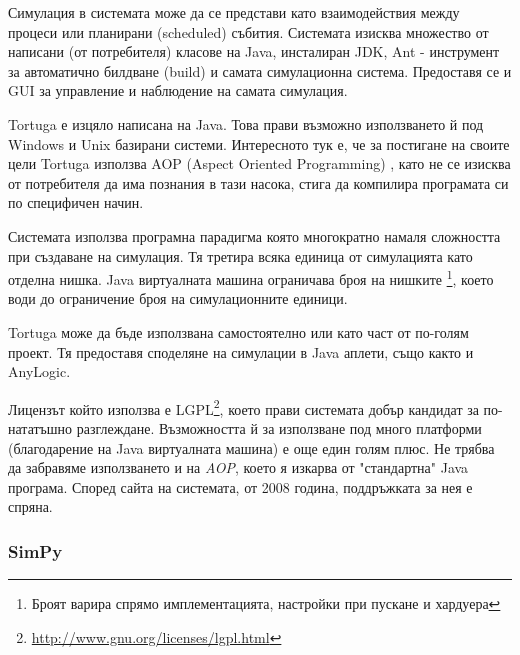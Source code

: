 			
				Симулация в системата може да се представи като взаимодействия между процеси или планирани (scheduled) събития.
				Системата изисква множество от написани (от потребителя) класове на Java, инсталиран \ac{JDK}, 
				Ant - инструмент за автоматично билдване (build) и самата симулационна система. 
				Предоставя се и \ac{GUI} за управление и наблюдение на самата симулация.
			
			
				Tortuga е изцяло написана на Java. Това прави възможно използването й под Windows и Unix базирани системи.
				Интересното тук е, че за постигане на своите цели Tortuga използва AOP (Aspect Oriented Programming)
				\cite{AOP}, като не се изисква от потребителя да има познания в тази насока, стига да компилира 
				програмата си по специфичен начин. 			
			
			
				Системата използва програмна парадигма която многократно намаля сложността при създаване на симулация.
				Тя третира всяка единица от симулацията като отделна нишка. Java виртуалната машина ограничава броя на нишките
				\footnote{Броят варира спрямо имплементацията, настройки при пускане и хардуера}, 
				което води до ограничение броя на симулационните единици.
			
			
	 			Tortuga може да бъде използвана самостоятелно или като част от по-голям проект. 
	 			Тя предоставя споделяне на симулации в Java аплети, също както и AnyLogic.
 			
 			
	 			Лицензът който използва е \ac{LGPL}\footnote{\url{http://www.gnu.org/licenses/lgpl.html}}, 
	 			което прави системата добър кандидат за по-нататъшно разглеждане.
	 			Възможността й за използване под много платформи (благодарение на Java виртуалната машина) е 
	 			още един голям плюс.
	 			Не трябва да забравяме използването и на \emph{AOP}, което я изкарва от "стандартна" Java програма.
	 			Според сайта на системата, от 2008 година, поддръжката за нея е спряна. \cite{Tortuga}
					
		\subsubsection{SimPy}
			
